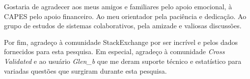 Gostaria de agradecer aos meus amigos e familiares pelo apoio emocional, à CAPES pelo apoio financeiro. Ao meu orientador pela paciência e dedicação. Ao grupo de estudos de sistemas colaborativos, pela amizade e valiosas discussões.

Por fim, agradeço à comunidade StackExchange por ser incrível e pelos dados fornecidos para esta pesquisa. Em especial, agradeço à comunidade \textit{Cross Validated} e ao usuário \textit{Glen\_b} que me deram suporte técnico e estatístico para variadas questões que surgiram durante esta pesquisa. 
